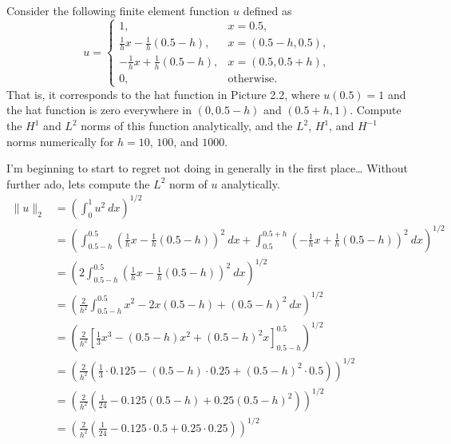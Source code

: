\begin{exercise}
    Consider the following finite element function $u$ defined as
    \begin{equation*}
        u =
        \begin{cases}
            1, & x = 0.5, \\
            \frac{1}{h} x - \frac{1}{h} (0.5 - h), & x = (0.5 - h, 0.5), \\
            -\frac{1}{h} x + \frac{1}{h} (0.5 - h), & x = (0.5, 0.5 + h), \\
            0, & \text{otherwise}.
        \end{cases}
    \end{equation*}
    That is, it corresponds to the hat function in Picture 2.2, where $u(0.5) = 1$ and the hat function is zero everywhere in $(0, 0.5 - h)$ and $(0.5 + h, 1)$.
    Compute the $H^1$ and $L^2$ norms of this function analytically, and the $L^2$, $H^1$, and $H^{-1}$ norms numerically for $h = 10$, $100$, and $1000$.
\end{exercise}

\begin{solution}
    I'm beginning to start to regret not doing in generally in the first place\dots
    Without further ado, lets compute the $L^2$ norm of $u$ analytically.
    \begin{align*}
        \lVert u \rVert_2 &= \left( \int_{0}^{1} u^2 \ dx \right)^{1/2} \\
        &= \left( \int_{0.5 - h}^{0.5} \left( \frac{1}{h} x - \frac{1}{h} (0.5 - h) \right)^2 \ dx + \int_{0.5}^{0.5 + h} \left( -\frac{1}{h} x + \frac{1}{h} (0.5 - h) \right)^2 \ dx \right)^{1/2} \\
        &= \left(
            2 \int_{0.5 - h}^{0.5} \left( \frac{1}{h} x - \frac{1}{h} (0.5 - h) \right)^2 \ dx
        \right)^{1/2} \\
        &= \left(
            \frac{2}{h^2} \int_{0.5 - h}^{0.5} x^2 - 2x(0.5 - h) + (0.5 - h)^2 \ dx
        \right)^{1/2} \\
        &= \left(
            \frac{2}{h^2} \left[ \frac{1}{3} x^3 - (0.5 - h) x^2 + (0.5 - h)^2 x \right]_{0.5 - h}^{0.5}
        \right)^{1/2} \\
        &= \left(
            \frac{2}{h^2} \left( \frac{1}{3} \cdot 0.125 - (0.5 - h) \cdot 0.25 + (0.5 - h)^2 \cdot 0.5 \right)
        \right)^{1/2} \\
        &= \left(
            \frac{2}{h^2} \left( \frac{1}{24} - 0.125(0.5 - h) + 0.25(0.5 - h)^2 \right)
        \right)^{1/2} \\
        &= \left(
            \frac{2}{h^2} \left( \frac{1}{24} - 0.125 \cdot 0.5 + 0.25 \cdot 0.25 \right)
        \right)^{1/2} \\
    \end{align*}
\end{solution}